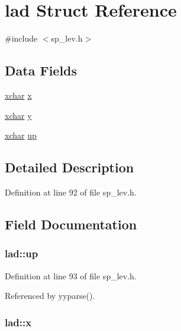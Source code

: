 \hypertarget{structlad}{\section{lad Struct Reference}
\label{structlad}
}


{\ttfamily \#include $<$sp\+\_\+lev.\+h$>$}

\subsection*{Data Fields}
\begin{DoxyCompactItemize}
\item 
\hyperlink{global_8h_a2043b7d01ce89f4ee2fa6c345a752d32}{xchar} \hyperlink{structlad_a3b494b64c6d111cbcc059351fb154055}{x}
\item 
\hyperlink{global_8h_a2043b7d01ce89f4ee2fa6c345a752d32}{xchar} \hyperlink{structlad_a5b9678013ed20dc567ad41299bbe1ebd}{y}
\item 
\hyperlink{global_8h_a2043b7d01ce89f4ee2fa6c345a752d32}{xchar} \hyperlink{structlad_a00716d5e86c1913dbd49dced6111c312}{up}
\end{DoxyCompactItemize}


\subsection{Detailed Description}


Definition at line 92 of file sp\+\_\+lev.\+h.



\subsection{Field Documentation}
\hypertarget{structlad_a00716d5e86c1913dbd49dced6111c312}{
\subsubsection[{up}]{ lad\+::up}}\label{structlad_a00716d5e86c1913dbd49dced6111c312}


Definition at line 93 of file sp\+\_\+lev.\+h.



Referenced by yyparse().

\hypertarget{structlad_a3b494b64c6d111cbcc059351fb154055}{
\subsubsection[{x}]{ lad\+::x}}\label{structlad_a3b494b64c6d111cbcc059351fb154055}


